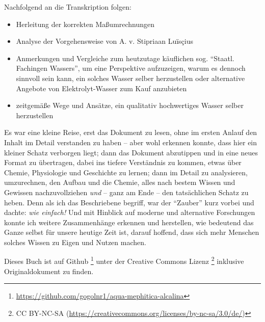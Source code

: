 \documentclass[a5paper,fontsize=10pt]{memoir}
\begin{document}
\setcounter{page}{1}

Nachfolgend an die Transkription folgen:
\begin{itemize}
\item Herleitung der korrekten Maßumrechnungen
\item Analyse der Vorgehensweise von A. v. Stipriaan Luïsçius
\item Anmerkungen und Vergleiche
zum heutzutage käuflichen sog. ``Staatl. Fachingen Wassers'',
um eine Perspektive aufzuzeigen,
warum es dennoch sinnvoll sein kann,
ein solches Wasser selber herzustellen oder
alternative Angebote von Elektrolyt-Wasser zum Kauf anzubieten
\item zeitgemäße Wege und Ansätze, ein qualitativ hochwertiges Wasser selber herzustellen
\end{itemize}

Es war eine kleine Reise,
erst das Dokument zu lesen,
ohne im ersten Anlauf den Inhalt im Detail verstanden zu haben --
aber wohl erkennen konnte,
dass hier ein kleiner Schatz verborgen liegt;
dann das Dokument abzutippen
und in eine neues Format zu übertragen,
dabei ins tiefere Verständnis zu kommen,
etwas über Chemie, Physiologie und Geschichte zu lernen;
dann im Detail zu analysieren, umzurechnen,
den Aufbau und die Chemie,
alles nach bestem Wissen und Gewissen nachzuvollziehen
\emph{und} -- ganz am Ende -- den tatsächlichen Schatz zu heben.
Denn als ich das Beschriebene begriff,
war der ``Zauber'' kurz vorbei
und dachte: \emph{wie einfach!}
Und mit Hinblick auf moderne und alternative Forschungen
konnte ich weitere Zusammenhänge erkennen und herstellen,
wie bedeutend das Ganze selbst für unsere heutige Zeit ist,
darauf hoffend, dass sich mehr Menschen
solches Wissen zu Eigen und Nutzen machen.

Dieses Buch ist auf Github%
\footnote{\href{https://github.com/gogolnr1/aqua-mephitica-alcalina}{https://github.com/gogolnr1/aqua-mephitica-alcalina}}
unter der Creative Commons Lizenz%
\footnote{CC BY-NC-SA (\href{https://creativecommons.org/licenses/by-nc-sa/3.0/de/}{https://creativecommons.org/licenses/by-nc-sa/3.0/de/})}
inklusive Originaldokument
zu finden.%
%
\checkoddpage\ifoddpage
  \newpage\strut
  \fi
\end{document}

